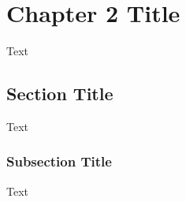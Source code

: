 \chapter{Chapter 2 Title}\label{chap2}
Text

\section{Section Title}  %
Text

\subsection{Subsection Title} %
Text